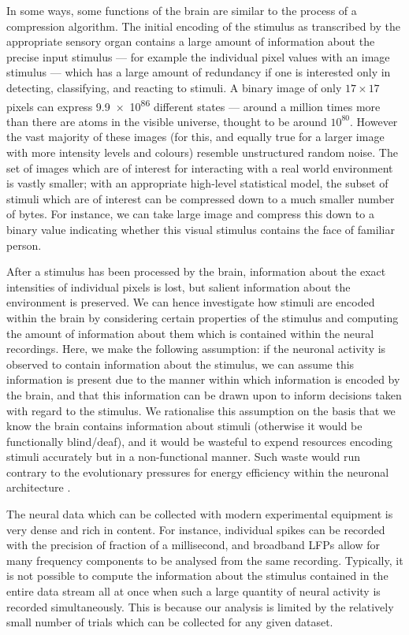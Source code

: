 In some ways, some functions of the brain are similar to the process of a compression algorithm.
The initial encoding of the stimulus as transcribed by the appropriate sensory organ contains a large amount of information about the precise input stimulus --- for example the individual pixel values with an image stimulus --- which has a large amount of redundancy if one is interested only in detecting, classifying, and reacting to stimuli.
A binary image of only $17 \times 17$ pixels can express \num{9.9e86} different states --- around a million times more than there are atoms in the visible universe, thought to be around $10^{80}$.
However the vast majority of these images (for this, and equally true for a larger image with more intensity levels and colours) resemble unstructured random noise.
The set of images which are of interest for interacting with a real world environment is vastly smaller; with an appropriate high-level statistical model, the subset of stimuli which are of interest can be compressed down to a much smaller number of bytes.
For instance, we can take large image and compress this down to a binary value indicating whether this visual stimulus contains the face of familiar person.

After a stimulus has been processed by the brain, information about the exact intensities of individual pixels is lost, but salient information about the environment is preserved.
We can hence investigate how stimuli are encoded within the brain by considering certain properties of the stimulus and computing the amount of information about them which is contained within the neural recordings.
Here, we make the following assumption: if the neuronal activity is observed to contain information about the stimulus, we can assume this information is present due to the manner within which information is encoded by the brain, and that this information can be drawn upon to inform decisions taken with regard to the stimulus.
We rationalise this assumption on the basis that we know the brain contains information about stimuli (otherwise it would be functionally blind/deaf), and it would be wasteful to expend resources encoding stimuli accurately but in a non-functional manner.
Such waste would run contrary to the evolutionary pressures for energy efficiency within the neuronal architecture \citep{Laughlin2001,Niven2008}.

The neural data which can be collected with modern experimental equipment is very dense and rich in content.
For instance, individual spikes can be recorded with the precision of fraction of a millisecond, and broadband \acp{LFP} allow for many frequency components to be analysed from the same recording.
Typically, it is not possible to compute the information about the stimulus contained in the entire data stream all at once when such a large quantity of neural activity is recorded simultaneously.
This is because our analysis is limited by the relatively small number of trials which can be collected for any given dataset.


